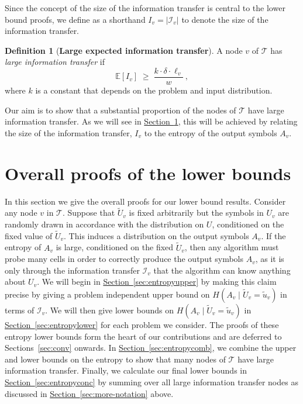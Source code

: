 \documentclass[11pt]{article}
\numberwithin{equation}{section}
\theoremstyle{definition}
\newtheorem{definition}[theorem]{Definition}
\theoremstyle{plain}
\newcommand{\expref}[2]{\hyperref[#2]{#1~\ref{#2}}}
\newcommand{\calT}{\ensuremath{\mathcal{T}}}
\newcommand{\expected}[1]{\ensuremath{\mathbb{E}[#1]}}
\newcommand{\lit}{large information transfer\xspace}
\newcommand{\Xv}{\ensuremath{U_v}}
\newcommand{\Xvknown}{\ensuremath{\widetilde{U}_v}}
\newcommand{\Xvfix}{\ensuremath{\widetilde{u}_v}}
\newcommand{\Yv}{\ensuremath{A_v}}
\newcommand{\vitset}{\ensuremath{\mathcal{I}_v}}
\newcommand{\vit}{\ensuremath{I_v}}
\begin{document}
Since the concept of the size of the information transfer is central to the lower bound proofs, we define as a shorthand $\vit=|\vitset|$ to denote the size of the information transfer.

\begin{definition}
	[\textbf{Large expected information transfer}]\label{def:large-it}
	A node $v$ of $\calT$ has \emph{\lit} if
	\[
	\expected{\vit} \;\geq\; \frac{k\cdot\delta\cdot\ell_v}{w}\,,
	\]
	where $k$ is a constant that depends on the problem and input distribution.
\end{definition}

Our aim is to show that a substantial proportion of the nodes of $\calT$ have \lit. As we will see in \expref{Section}{sec:proofs}, this will be achieved by relating the size of the information transfer, $\vit$ to the entropy of the output symbols $\Yv$.



\section{Overall proofs of the lower bounds}\label{sec:proofs}

In this section we give the overall proofs for our lower bound
results.
Consider any node $v$ in $\calT$. Suppose that $\Xvknown$ is fixed arbitrarily but the
symbols in $\Xv$ are randomly drawn in accordance with the distribution
on $U$, conditioned on the fixed value of $\Xvknown$. This induces
a distribution on the output symbols $\Yv$. If the entropy of $\Yv$ is
large, conditioned on the fixed $\Xvknown$, then any algorithm must
probe many cells in order to correctly produce the output symbols $\Yv$, as it is
only through the information transfer $\vitset$ that the algorithm
can know anything about $\Xv$. We will begin in \expref{Section}{sec:entropyupper} by making this claim
precise by giving a problem independent upper bound on  $H(\Yv\mid\Xvknown=\Xvfix)$ in terms of  $\vitset$. We will then give lower bounds on $H(\Yv\mid\Xvknown=\Xvfix)$ in  \expref{Section}{sec:entropylower} for each problem we consider. The proofs of these entropy lower bounds form the heart of our contributions and are deferred to Sections~\ref{sec:conv} onwards. In \expref{Section}{sec:entropycomb}, we combine the upper and lower bounds on the entropy to show that many nodes of $\calT$ have \lit. Finally, we calculate our final lower bounds in \expref{Section}{sec:entropyconc} by summing over all \lit nodes as discussed in \expref{Section}{sec:more-notation} above.
\end{document}

